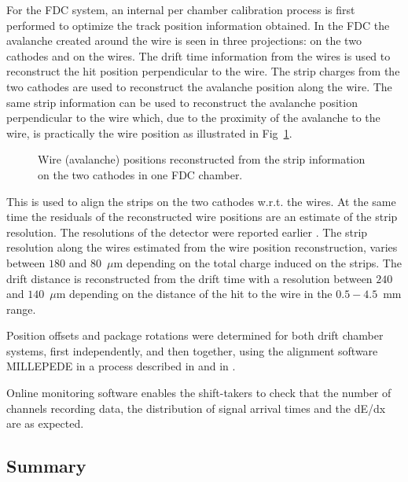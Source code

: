 For the FDC system, an internal per chamber calibration process is first performed to optimize the track position information obtained.  
In the FDC the avalanche created around the wire is seen in three projections: on the two cathodes and on the wires.
The drift time information from the wires is used to reconstruct the hit position perpendicular to the wire.
The strip charges from the two cathodes are used to reconstruct the avalanche position along the wire. 
The same strip information can be used to reconstruct the avalanche position perpendicular to the wire which, due to the proximity of the avalanche to the wire, is practically the wire position as illustrated in Fig~\ref{FDC_wires_from_strips}.
\begin{figure}[tbp]
\begin{center}
\caption{\label{FDC_wires_from_strips} Wire (avalanche) positions reconstructed from the strip information on the two cathodes in one FDC chamber.
}   
\end{center}  
\end{figure}
This is used to align the strips on the two cathodes w.r.t. the wires. 
At the same time the residuals of the reconstructed wire positions are an estimate of the strip resolution.
The resolutions of the detector were reported earlier \cite{FDC_NIM}. 
The strip resolution along the wires estimated from the wire position reconstruction, varies between $180$ and $80$~$\mu$m depending on the total charge induced on the strips. The drift distance is reconstructed from the drift time with a resolution between $240$ and $140$~$\mu$m
depending on the distance of the hit to the wire in the $0.5-4.5$~mm range.  

Position offsets and package rotations were determined for both drift chamber systems, first independently, and then together, using the alignment software MILLEPEDE\cite{millepede} in a process described in \cite{GlueXCDCNIM} and in \cite{MikeStaib_thesis}.

Online monitoring software enables the shift-takers to check that the number of channels recording data, the distribution of signal arrival times and the dE/dx are as expected. 




\subsection{Summary \label{sec:dcsummary}}
 
